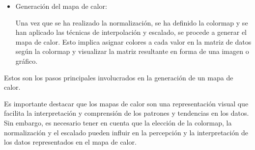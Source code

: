 \documentclass{article}
\begin{document}
\begin{itemize}
\begin{itemize}
\item Generación del mapa de calor:

Una vez que se ha realizado la normalización, se ha definido la colormap y se han aplicado las técnicas de interpolación y escalado, se procede a generar el mapa de calor. Esto implica asignar colores a cada valor en la matriz de datos según la colormap y visualizar la matriz resultante en forma de una imagen o gráfico.
\end{itemize}

Estos son los pasos principales involucrados en la generación de un mapa de calor.
\end{itemize}

Es importante destacar que los mapas de calor son una representación visual que facilita la interpretación y comprensión de los patrones y tendencias en los datos. Sin embargo, es necesario tener en cuenta que la elección de la colormap, la normalización y el escalado pueden influir en la percepción y la interpretación de los datos representados en el mapa de calor.
\end{document}
